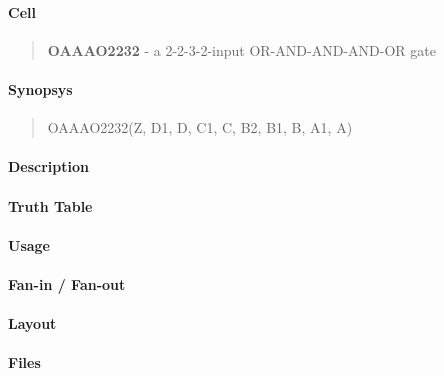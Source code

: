 \label{OAAAO2232}
\paragraph{Cell}
\begin{quote}
    \textbf{OAAAO2232} - a 2-2-3-2-input OR-AND-AND-AND-OR gate
\end{quote}

\paragraph{Synopsys}
\begin{quote}
    OAAAO2232(Z, D1, D, C1, C, B2, B1, B, A1, A)
\end{quote}

\paragraph{Description}

%

\paragraph{Truth Table}
%

\paragraph{Usage}

\paragraph{Fan-in / Fan-out}

\paragraph{Layout}

\paragraph{Files}
